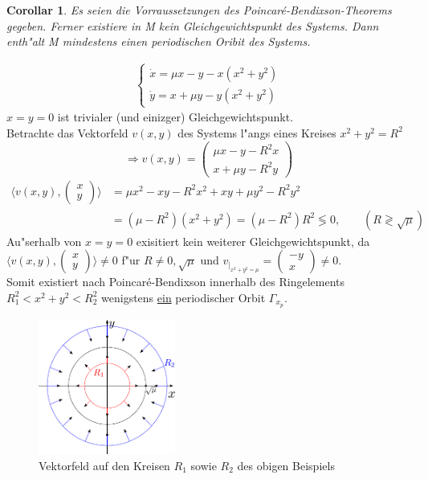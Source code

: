 \documentclass[a4paper, 13pt]{scrreprt}
\newtheorem{corollar}[theorem]{Corollar}
\theoremstyle{definition} \newtheorem{definition}{Definition}[section]
\newenvironment{beispiel}[1][Beispiel]{\begin{trivlist}
\item[\hskip \labelsep {\bfseries #1}]}{\end{trivlist}}
\begin{document}
\begin{corollar}
Es seien die Vorraussetzungen des Poincar\'{e}-Bendixson-Theorems gegeben. Ferner existiere in M kein Gleichgewichtspunkt des Systems. Dann enth"alt M mindestens einen periodischen Oribit des Systems.
\end{corollar}

\begin{beispiel}
	\begin{align*} \begin{cases}
		\dot{x} = \mu x - y - x(x^2+y^2) \\
		\dot{y} = x + \mu y - y(x^2+y^2)
	\end{cases} \end{align*}
	\(x=y=0\) ist trivialer (und einizger) Gleichgewichtspunkt. \\
	Betrachte das Vektorfeld \(v(x,y)\) des Systems l"angs eines Kreises \({x^2+y^2=R^2}\)
		\[\Rightarrow v(x,y) = \begin{pmatrix} \mu x - y - R^2x \\
		x + \mu y - R^2y \end{pmatrix} \]
		\begin{align*}
			\langle v(x,y), \begin{pmatrix} x \\ y \end{pmatrix} \rangle & = \mu x^2 - xy - R^2x^2 + xy + \mu y^2 - R^2y^2\\
			& = (\mu-R^2)(x^2+y^2) = (\mu - R^2)R^2 \lessgtr 0,\qquad ( R \gtrless \sqrt{\mu})
		\end{align*}
	Au"serhalb von \(x=y=0\) exisitiert kein weiterer Gleichgewichtspunkt, da \({\langle v(x,y),\begin{pmatrix} x \\ y \end{pmatrix} \rangle \not= 0}\) f"ur \(R\not= 0, \sqrt{\mu}\) und \(v_{|_{x^2+y^2=\mu}} = \begin{pmatrix} -y \\ x \end{pmatrix} \not= 0\).\\
	Somit existiert nach Poincar\'{e}-Bendixson innerhalb des Ringelements \newline \(R_1^2 < x^2+y^2 < R_2^2\) wenigstens \underline{ein} periodischer Orbit \(\Gamma_{x_p}\).
\end{beispiel}

\begin{figure}[htpb]
		\centering
		\includegraphics[width=0.4\textwidth]{img/poincare_Bendixson/beispiel_poincare_Bendixson.pdf}
		\caption{Vektorfeld auf den Kreisen $R_1$ sowie $R_2$ des obigen Beispiels}
\end{figure}
\end{document}
